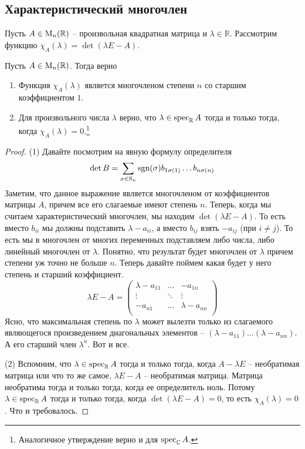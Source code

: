 \subsection{Характеристический многочлен}


Пусть $A\in\operatorname{M}_{n}(\mathbb R)$ -- произвольная квадратная матрица и $\lambda \in\mathbb R$. Рассмотрим функцию $\chi_A(\lambda) = \det(\lambda E - A)$.

\begin{claim}\label{claim::CharSpec}
Пусть $A\in\operatorname{M}_{n}(\mathbb R)$. Тогда верно
\begin{enumerate}
\item Функция $\chi_A(\lambda)$ является многочленом степени $n$ со старшим коэффициентом $1$.
\item Для произвольного числа $\lambda$ верно, что $\lambda \in\operatorname{spec}_\mathbb R A$ тогда и только тогда, когда $\chi_A(\lambda) = 0$.\footnote{Аналогичное утверждение верно и для $\operatorname{spec}_\mathbb C A$.}
\end{enumerate}
\end{claim}
\begin{proof}
(1) Давайте посмотрим на явную формулу определителя
\[
\det B = \sum_{\sigma\in\operatorname{S}_{n}}\operatorname{sgn}(\sigma) b_{1\sigma(1)}\ldots b_{n\sigma(n)}
\]
Заметим, что данное выражение является многочленом от коэффициентов матрицы $A$, причем все его слагаемые имеют степень $n$. Теперь, когда мы считаем характеристический многочлен, мы находим $\det(\lambda E - A)$. То есть вместо $b_{ii}$ мы должны подставить  $\lambda - a_{ii}$, а вместо $b_{ij}$ взять $-a_{ij}$ (при $i\neq j$). То есть мы в многочлен от многих переменных подставляем либо числа, либо линейный многочлен от $\lambda$. Понятно, что результат будет многочлен от $\lambda$ причем степени уж точно не больше $n$. Теперь давайте поймем какая будет у него степень и старший коэффициент.
\[
\lambda E - A = 
\begin{pmatrix}
{\lambda - a_{11}}&{\ldots}&{-a_{1n}}\\
{\vdots}&{\ddots}&{\vdots}\\
{-a_{n1}}&{\ldots}&{\lambda - a_{nn}}\\
\end{pmatrix}
\]
Ясно, что максимальная степень по $\lambda$ может вылезти только из слагаемого являющегося произведением диагональных элементов -- $(\lambda - a_{11}) \ldots (\lambda - a_{nn})$. А его старший член $\lambda^n$. Вот и все.

(2) Вспомним, что $\lambda\in\operatorname{spec}_\mathbb R A$ тогда и только тогда, когда $A - \lambda E$ -- необратимая матрица или что то же самое,  $\lambda E - A$ -- необратимая матрица. Матрица необратима тогда и только тогда, когда ее определитель ноль. Потому $\lambda \in\operatorname{spec}_\mathbb R A$ тогда и только тогда, когда $\det (\lambda E - A) = 0$, то есть $\chi_A(\lambda) = 0$. Что и требовалось.
\end{proof}

